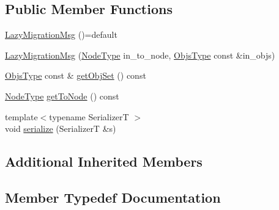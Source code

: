 \subsection*{Public Member Functions}
\begin{DoxyCompactItemize}
\item 
\hyperlink{structvt_1_1vrt_1_1collection_1_1balance_1_1_lazy_migration_msg_a05c45988e43b726f0792e8fb43183036}{Lazy\+Migration\+Msg} ()=default
\item 
\hyperlink{structvt_1_1vrt_1_1collection_1_1balance_1_1_lazy_migration_msg_aa63fe960ff146d67756b83b5e7d529e9}{Lazy\+Migration\+Msg} (\hyperlink{namespacevt_a866da9d0efc19c0a1ce79e9e492f47e2}{Node\+Type} in\+\_\+to\+\_\+node, \hyperlink{structvt_1_1vrt_1_1collection_1_1balance_1_1_lazy_migration_msg_a8d71e0015ee1e05da54701cae56ef31c}{Objs\+Type} const \&in\+\_\+objs)
\item 
\hyperlink{structvt_1_1vrt_1_1collection_1_1balance_1_1_lazy_migration_msg_a8d71e0015ee1e05da54701cae56ef31c}{Objs\+Type} const  \& \hyperlink{structvt_1_1vrt_1_1collection_1_1balance_1_1_lazy_migration_msg_ada6a86ba4aa7b806a9088f4ad395458d}{get\+Obj\+Set} () const
\item 
\hyperlink{namespacevt_a866da9d0efc19c0a1ce79e9e492f47e2}{Node\+Type} \hyperlink{structvt_1_1vrt_1_1collection_1_1balance_1_1_lazy_migration_msg_a94b5564dd7432421519a7e07bfa535c5}{get\+To\+Node} () const
\item 
{\footnotesize template$<$typename SerializerT $>$ }\\void \hyperlink{structvt_1_1vrt_1_1collection_1_1balance_1_1_lazy_migration_msg_a58b2680d2acf6ab6da98d421c21f3e20}{serialize} (SerializerT \&s)
\end{DoxyCompactItemize}
\subsection*{Additional Inherited Members}


\subsection{Member Typedef Documentation}
\mbox{\label{structvt_1_1vrt_1_1collection_1_1balance_1_1_lazy_migration_msg_a8d71e0015ee1e05da54701cae56ef31c}} 
